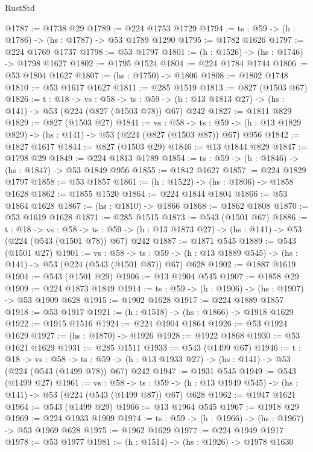 \begin{lexlean}{RustStd}
\begin{coremodule}
@1787 := @1738 @29
@1789 := @224 @1753 @1729
@1794 := {ts : @59} -> (h : @1786) -> (hs : @1787) -> @53 @1789 @1290
@1795 := @1782 @1626
@1797 := @224 @1769 @1737
@1798 := @53 @1797
@1801 := (h : @1526) -> (hs : @1746) -> @1798 @1627
@1802 := @1795 @1524
@1804 := @224 @1784 @1744
@1806 := @53 @1804 @1627
@1807 := (hs : @1750) -> @1806
@1808 := @1802 @1748
@1810 := @53 @1617 @1627
@1811 := @285 @1519
@1813 := @827 (@1503 @67)
@1826 := {t : @18} ->
  {vs : @58} ->
  {ts : @59} -> (h : @13 @1813 @27) -> (hs : @141) -> @53 (@224 (@827 (@1503 @78)) @67) @242
@1827 := @1811 @829
@1829 := @827 (@1503 @27)
@1841 := {vs : @58} ->
  {ts : @59} -> (h : @13 @1829 @829) -> (hs : @141) -> @53 (@224 (@827 (@1503 @87)) @67) @956
@1842 := @1827 @1617
@1844 := @827 (@1503 @29)
@1846 := @13 @1844 @829
@1847 := @1798 @29
@1849 := @224 @1813 @1789
@1854 := {ts : @59} -> (h : @1846) -> (hs : @1847) -> @53 @1849 @956
@1855 := @1842 @1627
@1857 := @224 @1829 @1797
@1858 := @53 @1857
@1861 := (h : @1522) -> (hs : @1806) -> @1858 @1628
@1862 := @1855 @1520
@1864 := @224 @1844 @1804
@1866 := @53 @1864 @1628
@1867 := (hs : @1810) -> @1866
@1868 := @1862 @1808
@1870 := @53 @1619 @1628
@1871 := @285 @1515
@1873 := @543 (@1501 @67)
@1886 := {t : @18} ->
  {vs : @58} ->
  {ts : @59} -> (h : @13 @1873 @27) -> (hs : @141) -> @53 (@224 (@543 (@1501 @78)) @67) @242
@1887 := @1871 @545
@1889 := @543 (@1501 @27)
@1901 := {vs : @58} ->
  {ts : @59} -> (h : @13 @1889 @545) -> (hs : @141) -> @53 (@224 (@543 (@1501 @87)) @67) @628
@1902 := @1887 @1619
@1904 := @543 (@1501 @29)
@1906 := @13 @1904 @545
@1907 := @1858 @29
@1909 := @224 @1873 @1849
@1914 := {ts : @59} -> (h : @1906) -> (hs : @1907) -> @53 @1909 @628
@1915 := @1902 @1628
@1917 := @224 @1889 @1857
@1918 := @53 @1917
@1921 := (h : @1518) -> (hs : @1866) -> @1918 @1629
@1922 := @1915 @1516
@1924 := @224 @1904 @1864
@1926 := @53 @1924 @1629
@1927 := (hs : @1870) -> @1926
@1928 := @1922 @1868
@1930 := @53 @1621 @1629
@1931 := @285 @1511
@1933 := @543 (@1499 @67)
@1946 := {t : @18} ->
  {vs : @58} ->
  {ts : @59} -> (h : @13 @1933 @27) -> (hs : @141) -> @53 (@224 (@543 (@1499 @78)) @67) @242
@1947 := @1931 @545
@1949 := @543 (@1499 @27)
@1961 := {vs : @58} ->
  {ts : @59} -> (h : @13 @1949 @545) -> (hs : @141) -> @53 (@224 (@543 (@1499 @87)) @67) @628
@1962 := @1947 @1621
@1964 := @543 (@1499 @29)
@1966 := @13 @1964 @545
@1967 := @1918 @29
@1969 := @224 @1933 @1909
@1974 := {ts : @59} -> (h : @1966) -> (hs : @1967) -> @53 @1969 @628
@1975 := @1962 @1629
@1977 := @224 @1949 @1917
@1978 := @53 @1977
@1981 := (h : @1514) -> (hs : @1926) -> @1978 @1630

\end{coremodule}
\end{lexlean}
